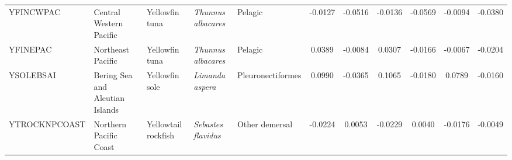 \begin{longtable}{p{3cm}p{3cm}lllcccccc}
  YFINCWPAC & Central Western Pacific & Yellowfin tuna & \textit{Thunnus albacares} & Pelagic & -0.0127 & -0.0516 & -0.0136 & -0.0569 & -0.0094 & -0.0380 \\
  YFINEPAC & Northeast Pacific & Yellowfin tuna & \textit{Thunnus albacares} & Pelagic & 0.0389 & -0.0084 & 0.0307 & -0.0166 & -0.0067 & -0.0204 \\
  YSOLEBSAI & Bering Sea and Aleutian Islands & Yellowfin sole & \textit{Limanda aspera} & Pleuronectiformes & 0.0990 & -0.0365 & 0.1065 & -0.0180 & 0.0789 & -0.0160 \\
  YTROCKNPCOAST & Northern Pacific Coast & Yellowtail rockfish & \textit{Sebastes flavidus} & Other demersal & -0.0224 & 0.0053 & -0.0229 & 0.0040 & -0.0176 & -0.0049 \\
   \hline
\hline
\end{longtable}
